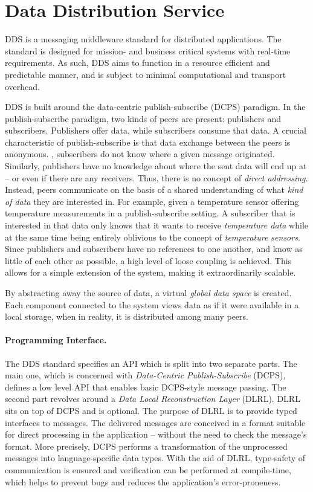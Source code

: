 \section{Data Distribution Service}

DDS is a messaging middleware standard \cite{dds-1.4-standard} for distributed applications. The standard is designed for mission- and business critical systems with real-time requirements. As such, DDS aims to function in a resource efficient and predictable manner, and is subject to minimal computational and transport overhead.

DDS is built around the data-centric publish-subscribe (DCPS) paradigm. In the publish-subscribe paradigm, two kinds of peers are present: publishers and subscribers. Publishers offer data, while subscribers consume that data. A crucial characteristic of publish-subscribe is that data exchange between the peers is anonymous. \Ie , subscribers do not know where a given message originated. Similarly, publishers have no knowledge about where the sent data will end up at -- or even if there are any receivers. Thus, there is no concept of \emph{direct addressing}. Instead, peers communicate on the basis of a shared understanding of what \emph{kind of data} they are interested in. 
For example, given a temperature sensor offering temperature measurements in a publish-subscribe setting. A subscriber that is interested in that data only knows that it wants to receive \emph{temperature data} while at the same time being entirely oblivious to the concept of \emph{temperature sensors}. 
Since publishers and subscribers have no references to one another, and know as little of each other as possible, a high level of loose coupling is achieved. This allows for a simple extension of the system, making it extraordinarily scalable.

By abstracting away the source of data, a virtual \emph{global data space} is created. Each component connected to the system views data as if it were available in a local storage, when in reality, it is distributed among many peers.


\paragraph{Programming Interface.}
The DDS standard specifies an API which is split into two separate parts. The main one, which is concerned with \emph{Data-Centric Publish-Subscribe} (DCPS), defines a low level API that enables basic DCPS-style message passing. The second part revolves around a \emph{Data Local Reconstruction Layer} (DLRL). DLRL sits on top of DCPS and is optional. The purpose of DLRL is to provide typed interfaces to messages. The delivered messages are conceived in a format suitable for direct processing in the application -- without the need to check the message's format. More precisely, DCPS performs a transformation of the unprocessed messages into language-specific data types. With the aid of DLRL, type-safety of communication is ensured and verification can be performed at compile-time, which helps to prevent bugs and reduces the application's error-proneness.


